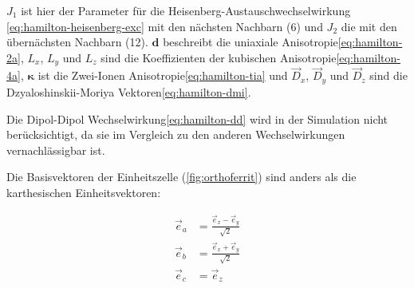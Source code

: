\documentclass[main.tex]{subfiles}
\begin{document}
\(J_1\) ist hier der Parameter für die Heisenberg-Austauschwechselwirkung
\eqref{eq:hamilton-heisenberg-exc} mit den nächsten Nachbarn (6) und \(J_2\)
die mit den übernächsten Nachbarn (12). \(\bm{d}\)
beschreibt die uniaxiale Anisotropie\eqref{eq:hamilton-2a}, \(L_x\), \(L_y\)
und \(L_z\) sind die Koeffizienten der kubischen
Anisotropie\eqref{eq:hamilton-4a}, \(\bm{\kappa}\) ist die Zwei-Ionen
Anisotropie\eqref{eq:hamilton-tia} und \(\vec{D}_x\), \(\vec{D}_y\) und
\(\vec{D}_z\) sind die Dzyaloshinskii-Moriya Vektoren\eqref{eq:hamilton-dmi}.

Die Dipol-Dipol Wechselwirkung\eqref{eq:hamilton-dd} wird in der Simulation
nicht berücksichtigt, da sie im Vergleich zu den anderen Wechselwirkungen
vernachlässigbar ist.

Die Basisvektoren der Einheitszelle (\cref{fig:orthoferrit}) sind anders als die karthesischen Einheitsvektoren: 

\begin{align}
	\vec{e}_a &= \frac{\vec{e}_x - \vec{e}_y}{\sqrt{2}} \\
	\vec{e}_b &= \frac{\vec{e}_x + \vec{e}_y}{\sqrt{2}} \\
	\vec{e}_c &= \vec{e}_z
\end{align}
\end{document}
